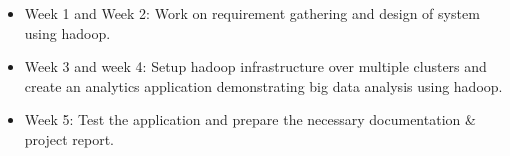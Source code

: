 \begin{itemize}
	\item Week 1 and Week 2: Work on requirement gathering and design of system using hadoop.
	\item Week 3 and week 4: Setup hadoop infrastructure over multiple clusters and create an analytics application demonstrating big data analysis using hadoop.
	\item Week 5: Test the application and prepare the necessary documentation & project report.
\end{itemize}
